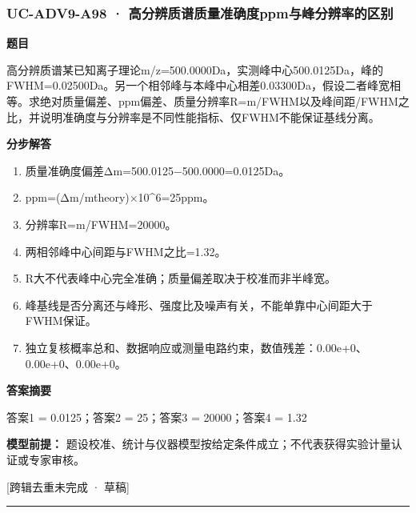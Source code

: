 \documentclass[UTF8,11pt,a4paper]{ctexart}
\begin{document}
\subsubsection*{UC-ADV9-A98 · 高分辨质谱质量准确度ppm与峰分辨率的区别}
\noindent\textbf{题目}\par
高分辨质谱某已知离子理论m/z=500.0000Da，实测峰中心500.0125Da，峰的FWHM=0.02500Da。另一个相邻峰与本峰中心相差0.03300Da，假设二者峰宽相等。求绝对质量偏差、ppm偏差、质量分辨率R=m/FWHM以及峰间距/FWHM之比，并说明准确度与分辨率是不同性能指标、仅FWHM不能保证基线分离。\par
\medskip\noindent\textbf{分步解答}
\begin{enumerate}
\item 质量准确度偏差Δm=500.0125−500.0000=0.0125Da。
\item ppm=(Δm/mtheory)×10\textasciicircum{}6=25ppm。
\item 分辨率R=m/FWHM=20000。
\item 两相邻峰中心间距与FWHM之比=1.32。
\item R大不代表峰中心完全准确；质量偏差取决于校准而非半峰宽。
\item 峰基线是否分离还与峰形、强度比及噪声有关，不能单靠中心间距大于FWHM保证。
\item 独立复核概率总和、数据响应或测量电路约束，数值残差：0.00e+0、0.00e+0、0.00e+0。
\end{enumerate}
\noindent\textbf{答案摘要}\par
答案1 = 0.0125；答案2 = 25；答案3 = 20000；答案4 = 1.32\par
\noindent\textbf{模型前提：}
题设校准、统计与仪器模型按给定条件成立；不代表获得实验计量认证或专家审核。\par
\noindent\textcolor{red!65!black}{[跨辑去重未完成 · 草稿]} \par
\medskip\hrule\medskip
{}
\end{document}
